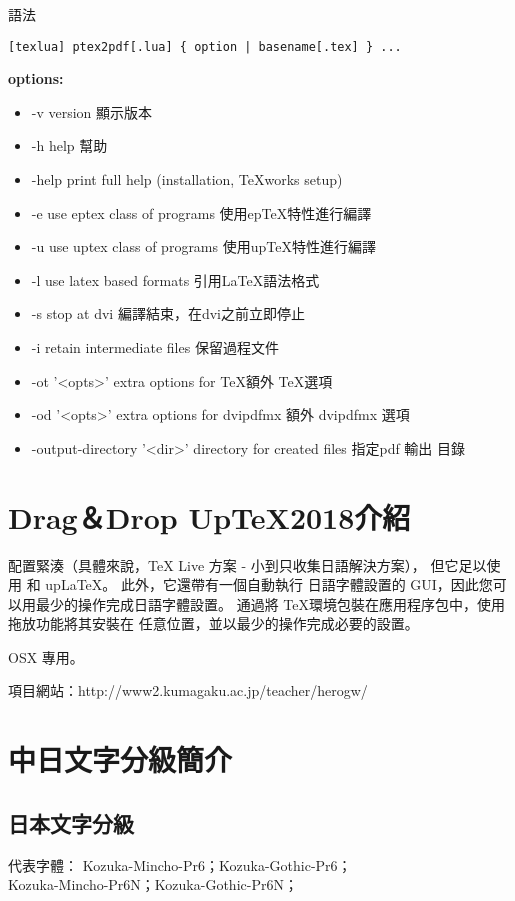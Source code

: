 \documentclass[a4,11pt,uplatex,openleft]{jsarticle}
\begin{document}
\begin{appendix}
{ \bfseries \par  語法 }
\begin{lstlisting}
[texlua] ptex2pdf[.lua] { option | basename[.tex] } ...
\end{lstlisting}
{ \bfseries  options:}
\begin{itemize}
\item \quad  -v  version  \qquad 顯示版本
\item \quad  -h  help  \qquad 幫助
\item \quad  -help print full help (installation, TeXworks setup)
\item \quad  -e  use eptex class of programs  \qquad 使用ep\TeX 特性進行編譯
\item \quad  -u  use uptex class of programs  \qquad 使用up\TeX 特性進行編譯
\item \quad  -l  use latex based formats  \qquad 引用\LaTeX 語法格式
\item \quad  -s  stop at dvi  \qquad 編譯結束，在dvi之前立即停止
\item \quad  -i  retain intermediate files  \qquad 保留過程文件
\item \quad  -ot '<opts>' extra options for  \TeX   \qquad 額外 \TeX 選項
\item \quad  -od '<opts>' extra options for dvipdfmx   \qquad 額外 dvipdfmx 選項
\item \quad  -output-directory '<dir>' directory for created files   \qquad 指定pdf 輸出 目錄
\end{itemize}


\section{ Drag＆Drop Up\TeX 2018介紹}\label{uptex-xiongben}

配置緊湊（具體來說，TeX Live 方案 - 小到只收集日語解決方案），
但它足以使用 \pLaTeX 和 up\LaTeX。 此外，它還帶有一個自動執行
日語字體設置的 GUI，因此您可以用最少的操作完成日語字體設置。
通過將 \TeX 環境包裝在應用程序包中，使用拖放功能將其安裝在
任意位置，並以最少的操作完成必要的設置。

OSX 專用。

項目網站：http://www2.kumagaku.ac.jp/teacher/herogw/

\clearpage
\section{中日文字分級簡介}
\subsection{日本文字分級}
{\gtfamily
代表字體： Kozuka-Mincho-Pr6；Kozuka-Gothic-Pr6；\\
\qquad \qquad \qquad Kozuka-Mincho-Pr6N；Kozuka-Gothic-Pr6N；}


\end{appendix}
\end{document}
